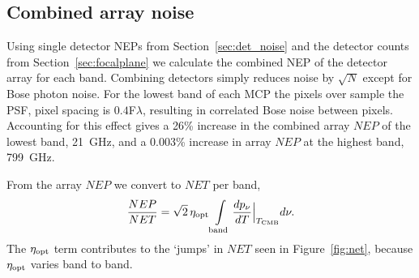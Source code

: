 \documentclass[]{spie}  %
\begin{document}

\subsection{Combined  array noise}

Using single detector NEPs from Section~\ref{sec:det_noise} and the detector counts from Section~\ref{sec:focalplane} we 
calculate the combined NEP of the detector array for each band.  Combining detectors simply reduces noise by $\sqrt{N}$ 
except for Bose photon noise. For the lowest band of each MCP the pixels over sample the PSF, pixel spacing is $0.4$F$\lambda$, resulting in correlated 
Bose noise between pixels.  Accounting for this effect gives a 26\% increase in the combined array $NEP$ of the lowest band, 21~GHz, and  
a 0.003\% increase in array $NEP$ at the highest band, 799~GHz.  

From the array $NEP$ we convert to $NET$ per band,
\begin{equation}
\label{eq:NET}
\frac{NEP}{NET} = \sqrt{2} \, \eta_{\rm opt} \int\limits_{\rm band}\frac{dp_{\nu}}{dT}\Bigr|_{T_{\rm CMB}} d\nu.
\end{equation} 
The $\eta_{\rm opt}$ term contributes to the `jumps' in $NET$ seen in Figure~\ref{fig:net}, because $\eta_{\rm opt}$ varies band to band.  
\end{document}

